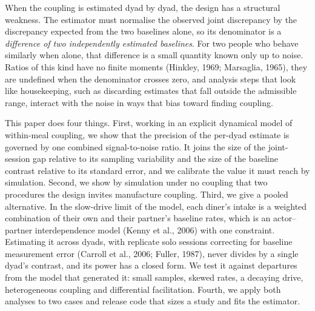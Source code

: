 \documentclass[12pt]{article}
\begin{document}
When the coupling is estimated dyad by dyad, the design has a structural
weakness. The estimator must normalise the observed joint discrepancy by the
discrepancy expected from the two baselines alone, so its denominator is a
\emph{difference of two independently estimated baselines}. For two people who
behave similarly when alone, that difference is a small quantity known only up to
noise. Ratios of this kind have no finite moments (Hinkley, 1969; Marsaglia, 1965), they are
undefined when the denominator crosses zero, and analysis steps that look like
housekeeping, such as discarding estimates that fall outside the admissible
range, interact with the noise in ways that bias toward finding coupling.

This paper does four things. First, working in an explicit dynamical model of
within-meal coupling, we show that the precision of the per-dyad estimate is
governed by one combined signal-to-noise ratio. It joins the size of the
joint-session gap relative to its sampling variability and the size of the
baseline contrast relative to its standard error, and we calibrate the value it
must reach by simulation. Second, we show by simulation under no coupling that two
procedures the design invites manufacture coupling. Third, we give a pooled alternative. In
the slow-drive limit of the model, each diner's intake is a weighted combination
of their own and their partner's baseline rates, which is an actor--partner
interdependence model (Kenny et al., 2006) with one constraint. Estimating it
across dyads, with replicate solo sessions correcting for baseline measurement
error (Carroll et al., 2006; Fuller, 1987), never
divides by a single dyad's contrast, and its power has a closed form. We test it
against departures from the model that generated it: small samples, skewed rates,
a decaying drive, heterogeneous coupling and differential facilitation. Fourth, we
apply both analyses to two cases and release code that sizes a study and fits the
estimator.
\end{document}
